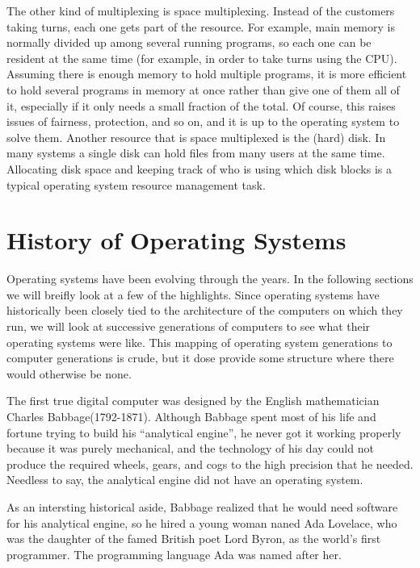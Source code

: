 \documentclass{book}
\begin{document}
The other kind of multiplexing is space multiplexing. 
Instead of the customers taking turns, each one gets part of the resource.
For example, main memory is normally divided up among several running programs, so each one can be resident at the same time 
(for example, in order to take turns using the CPU).
Assuming there is enough memory to hold multiple programs, 
it is more efficient to hold several programs in memory at once rather than give one of them all of it, 
especially if it only needs a small fraction of the total.
Of course, this raises issues of fairness, protection, and so on, and it is up to the operating system to solve them.
Another resource that is space multiplexed is the (hard) disk.
In many systems a single disk can hold files from many users at the same time.
Allocating disk space and keeping track of who is using which disk blocks is a typical operating system resource management task.

\section{History of Operating Systems}
Operating systems have been evolving through the years.
In the following sections we will breifly look at a few of the highlights.
Since operating systems have historically been closely tied to the architecture of the computers on which they run, 
we will look at successive generations of computers to see what their operating systems were like.
This mapping of operating system generations to computer generations is crude, but it dose provide some structure where there would otherwise be none.

The first true digital computer was designed by the English mathematician Charles Babbage(1792-1871).
Although Babbage spent most of his life and fortune trying to build his ``analytical engine'', 
he never got it working properly because it was purely mechanical, 
and the technology of his day could not produce the required wheels, gears, and cogs to the high precision that he needed.
Needless to say, the analytical engine did not have an operating system.

As an intersting historical aside, Babbage realized that he would need software for his analytical engine, 
so he hired a young woman naned Ada Lovelace, who was the daughter of the famed British poet Lord Byron, as the world's first programmer.
The programming language Ada was named after her.
\end{document}
